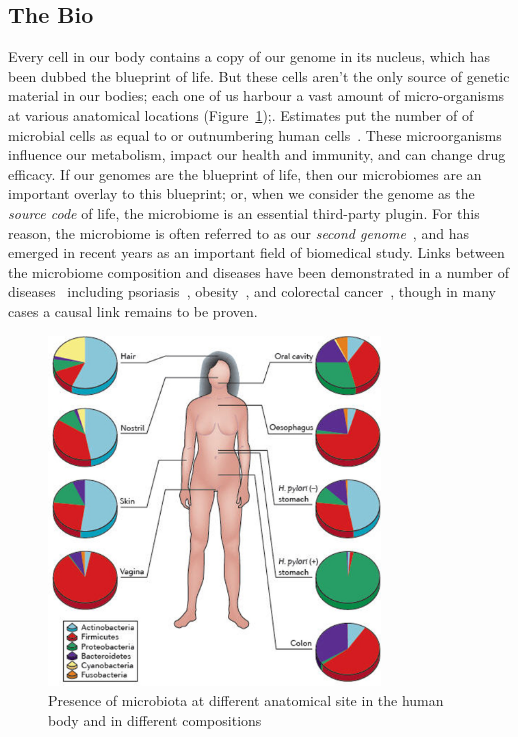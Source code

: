 \begin{justify}
\subsection{The Bio}

Every cell in our body contains a copy of our genome in its nucleus, which has been dubbed the blueprint of life. But these cells aren't the only source of genetic material in our bodies; each one of us harbour a vast amount of micro-organisms at various anatomical locations (Figure~\ref{fig:microbiome});. Estimates put the number of of microbial cells as equal to or outnumbering human cells~\cite{sender2016outnumbered}. These microorganisms influence our metabolism, impact our health and immunity, and can change drug efficacy. If our genomes are the blueprint of life, then our microbiomes are an important overlay to this blueprint; or, when we consider the genome as the \emph{source code} of life, the microbiome is an essential third-party plugin. For this reason, the microbiome is often referred to as our \emph{second genome}~\cite{grice2012microbiome}, and has emerged in recent years as an important field of biomedical study. Links between the microbiome composition and diseases have been demonstrated in a number of diseases~\cite{cho2012human} including psoriasis~\cite{gao2008substantial}, obesity~\cite{turnbaugh2006obesity, ley2005obesity}, and colorectal cancer~\cite{castellarin2012fusobacterium,kostic2012genomic}, though in many cases a causal link remains to be proven.

\begin{figure}[h!]
    \centering
    \includegraphics[width=250pt]{chapters/images/mycrobiota/microbiome.jpg}
    \caption{Presence of microbiota at different anatomical site in the human body and in different compositions}
    \label{fig:microbiome}
\end{figure}


\end{justify}
